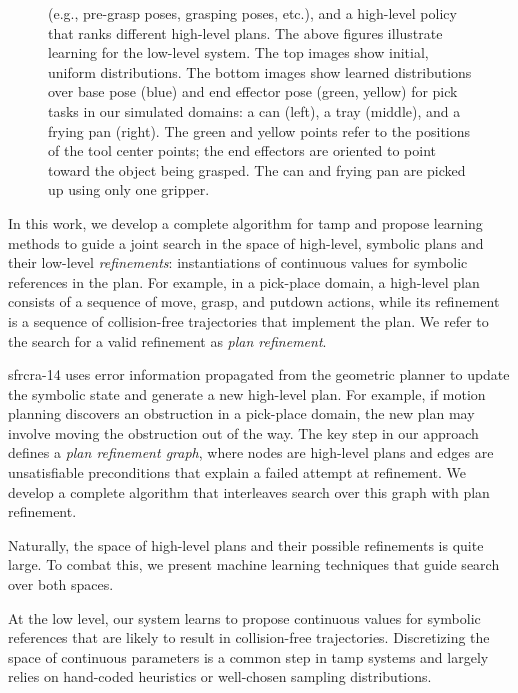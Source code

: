 \begin{figure}[t]
{{      (e.g., pre-grasp poses, grasping poses, etc.), and a high-level
      policy that ranks different high-level plans. The above figures
      illustrate learning for the low-level system. The top images
      show initial, uniform distributions. The bottom images show
      learned distributions over base pose (blue) and end effector
      pose (green, yellow) for pick tasks in our simulated domains: a
      can (left), a tray (middle), and a frying pan (right).  The
      green and yellow points refer to the positions of the tool
      center points; the end effectors are oriented to point toward
      the object being grasped. The can and frying pan are picked up
      using only one gripper.}}
  \label{fig:cover}
\end{figure}

In this work, we develop a complete algorithm for {\sc tamp} and
propose learning methods to guide a joint search in the space of
high-level, symbolic plans and their low-level \emph{refinements}:
instantiations of continuous values for symbolic references in the
plan. For example, in a pick-place domain, a high-level plan consists
of a sequence of move, grasp, and putdown actions, while its
refinement is a sequence of collision-free trajectories that implement
the plan. We refer to the search for a valid refinement as \emph{plan
  refinement}.

{\sc sfrcra-14} uses error information propagated from the geometric
planner to update the symbolic state and generate a new high-level
plan.  For example, if motion planning discovers an obstruction in a
pick-place domain, the new plan may involve moving the obstruction out
of the way.  The key step in our approach defines a \emph{plan
  refinement graph}, where nodes are high-level plans and edges are
unsatisfiable preconditions that explain a failed attempt at
refinement. We develop a complete algorithm that interleaves search
over this graph with plan refinement.

Naturally, the space of high-level plans and their possible refinements is
quite large. To combat this, we present machine learning techniques
that guide search over both spaces.

At the low
level, our system learns to propose continuous values for symbolic
references that are likely to result in collision-free
trajectories. Discretizing the space of continuous parameters is a
common step in {\sc tamp} systems and largely relies on hand-coded
heuristics or well-chosen sampling distributions. 

